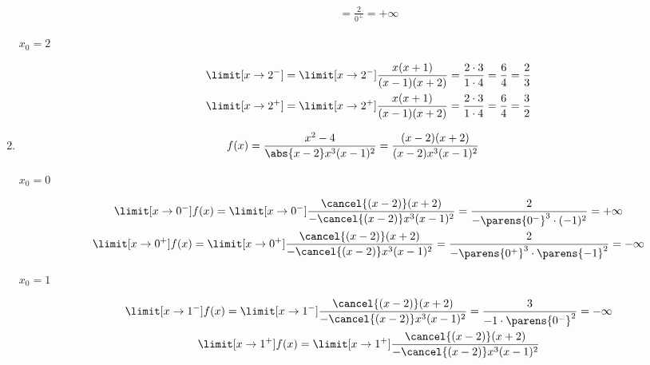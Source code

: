 \begin{enumerate}[label={\alph*)}]
    \item
        \begin{equation*}
            f(x) = \frac{x^2 - 4}{\abs{x - 2}x^3(x - 1)^2} = \frac{(x - 2)(x + 2)}{(x - 2)x^3(x - 1)^2}
        \end{equation*}
        \begin{description}
            \item[\(x_0 = 0\)]
                \begin{gather*}
                    \limit[x \to 0^-] f(x)
                        = \limit[x \to 0^-] \frac{\cancel{(x - 2)}(x + 2)}{-\cancel{(x - 2)}x^3(x - 1)^2}
                        = \frac{2}{-\parens{0^-}^3 \cdot (-1)^2}
                        = +\infty\\
                    \limit[x \to 0^+] f(x)
                        = \limit[x \to 0^+] \frac{\cancel{(x - 2)}(x + 2)}{-\cancel{(x - 2)}x^3(x - 1)^2}
                        = \frac{2}{-\parens{0^+}^3 \cdot \parens{-1}^2}
                        = -\infty
                \end{gather*}
            \item[\(x_0 = 1\)]
                \begin{gather*}
                    \limit[x \to 1^-] f(x)
                        = \limit[x \to 1^-] \frac{\cancel{(x - 2)}(x + 2)}{-\cancel{(x - 2)}x^3(x - 1)^2}
                        = \frac{3}{-1 \cdot \parens{0^-}^2}
                        = -\infty\\
                    \limit[x \to 1^+] f(x)
                        = \limit[x \to 1^+] \frac{\cancel{(x - 2)}(x + 2)}{-\cancel{(x - 2)}x^3(x - 1)^2}

\end{gather*}
\end{description}
\end{enumerate}
